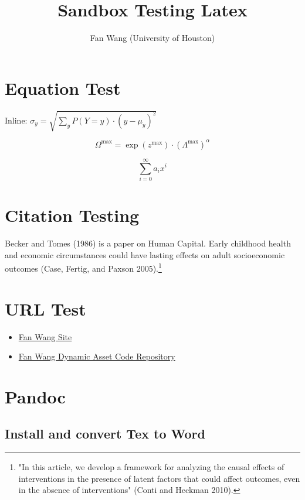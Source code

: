 \documentclass[]{article}
\title{Sandbox Testing Latex}
\author{Fan Wang (University of Houston)}
\date{}
\begin{document}
\maketitle

\hypertarget{equation-test}{%
\section{Equation Test}\label{equation-test}}

Inline:
\(\sigma_{y} = \sqrt{\sum_{y}^{}P(Y = y) \cdot \left( y - \mu_{y} \right)^{2}}\)

\[\Omega^{\max} = \exp(z^{\max}) \cdot \left( \Lambda^{\max} \right)^{\alpha}\]

\[\sum_{i = 0}^{\infty}a_{i}x^{i}\]

\hypertarget{citation-testing}{%
\section{Citation Testing}\label{citation-testing}}

Becker and Tomes (1986) is a paper on Human Capital. Early childhood
health and economic circumstances could have lasting effects on adult
socioeconomic outcomes (Case, Fertig, and Paxson 2005).\footnote{"In
  this article, we develop a framework for analyzing the causal effects
  of interventions in the presence of latent factors that could affect
  outcomes, even in the absence of interventions" (Conti and Heckman
  2010).}

\hypertarget{url-test}{%
\section{URL Test}\label{url-test}}

\begin{itemize}
\item
  \href{http://fanwangecon.github.io}{Fan Wang Site}
\item
  \href{https://fanwangecon.github.io/CodeDynaAsset/}{Fan Wang Dynamic
  Asset Code Repository}
\end{itemize}

\hypertarget{pandoc}{%
\section{Pandoc}\label{pandoc}}

\hypertarget{install-and-convert-tex-to-word}{%
\subsection{Install and convert Tex to
Word}\label{install-and-convert-tex-to-word}}
\end{document}
